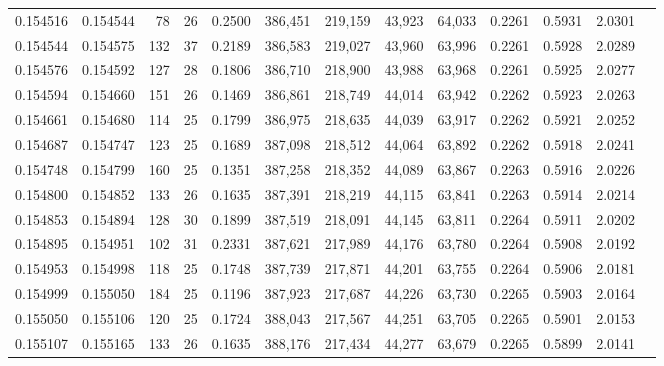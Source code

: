\begin{tabular}{rrrrrrrrrrrrr}
0.154516 & 0.154544 &  78 &  26 &                                     0.2500 & 386,451 & 219,159 &  43,923 &  64,033 & 0.2261 & 0.5931 & 2.0301 \\
0.154544 & 0.154575 & 132 &  37 &                                     0.2189 & 386,583 & 219,027 &  43,960 &  63,996 & 0.2261 & 0.5928 & 2.0289 \\
0.154576 & 0.154592 & 127 &  28 &                                     0.1806 & 386,710 & 218,900 &  43,988 &  63,968 & 0.2261 & 0.5925 & 2.0277 \\
0.154594 & 0.154660 & 151 &  26 &                                     0.1469 & 386,861 & 218,749 &  44,014 &  63,942 & 0.2262 & 0.5923 & 2.0263 \\
0.154661 & 0.154680 & 114 &  25 &                                     0.1799 & 386,975 & 218,635 &  44,039 &  63,917 & 0.2262 & 0.5921 & 2.0252 \\
0.154687 & 0.154747 & 123 &  25 &                                     0.1689 & 387,098 & 218,512 &  44,064 &  63,892 & 0.2262 & 0.5918 & 2.0241 \\
0.154748 & 0.154799 & 160 &  25 &                                     0.1351 & 387,258 & 218,352 &  44,089 &  63,867 & 0.2263 & 0.5916 & 2.0226 \\
0.154800 & 0.154852 & 133 &  26 &                                     0.1635 & 387,391 & 218,219 &  44,115 &  63,841 & 0.2263 & 0.5914 & 2.0214 \\
0.154853 & 0.154894 & 128 &  30 &                                     0.1899 & 387,519 & 218,091 &  44,145 &  63,811 & 0.2264 & 0.5911 & 2.0202 \\
0.154895 & 0.154951 & 102 &  31 &                                     0.2331 & 387,621 & 217,989 &  44,176 &  63,780 & 0.2264 & 0.5908 & 2.0192 \\
0.154953 & 0.154998 & 118 &  25 &                                     0.1748 & 387,739 & 217,871 &  44,201 &  63,755 & 0.2264 & 0.5906 & 2.0181 \\
0.154999 & 0.155050 & 184 &  25 &                                     0.1196 & 387,923 & 217,687 &  44,226 &  63,730 & 0.2265 & 0.5903 & 2.0164 \\
0.155050 & 0.155106 & 120 &  25 &                                     0.1724 & 388,043 & 217,567 &  44,251 &  63,705 & 0.2265 & 0.5901 & 2.0153 \\
0.155107 & 0.155165 & 133 &  26 &                                     0.1635 & 388,176 & 217,434 &  44,277 &  63,679 & 0.2265 & 0.5899 & 2.0141 \\

\end{tabular}
